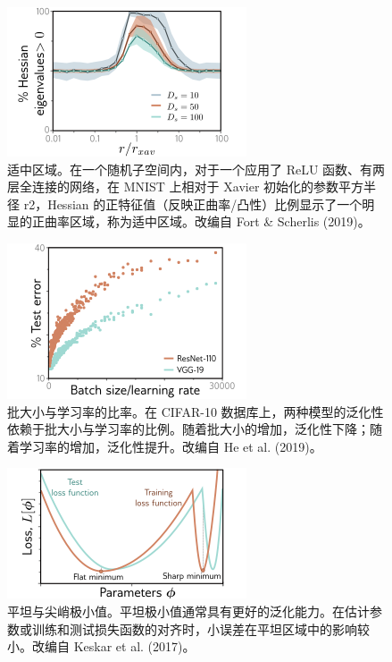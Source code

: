 \begin{figure}[ht!]
\centering
\includegraphics[width=0.7\linewidth]{png/chapter20/WhyGoldilocks.png}
\caption{适中区域。在一个随机子空间内，对于一个应用了 ReLU 函数、有两层全连接的网络，在 MNIST 上相对于 Xavier 初始化的参数平方半径 r2，Hessian 的正特征值（反映正曲率/凸性）比例显示了一个明显的正曲率区域，称为适中区域。改编自 Fort \& Scherlis (2019)。}
\end{figure}


\begin{figure}[ht!]
\centering
\includegraphics[width=0.7\linewidth]{png/chapter20/WhyBatchSizeLearningRate.png}
\caption{批大小与学习率的比率。在 CIFAR-10 数据库上，两种模型的泛化性依赖于批大小与学习率的比例。随着批大小的增加，泛化性下降；随着学习率的增加，泛化性提升。改编自 He et al. (2019)。}
\end{figure}


\begin{figure}[ht!]
\centering
\includegraphics[width=0.7\linewidth]{png/chapter20/WhyFlatness.png}
\caption{平坦与尖峭极小值。平坦极小值通常具有更好的泛化能力。在估计参数或训练和测试损失函数的对齐时，小误差在平坦区域中的影响较小。改编自 Keskar et al. (2017)。}
\end{figure}

